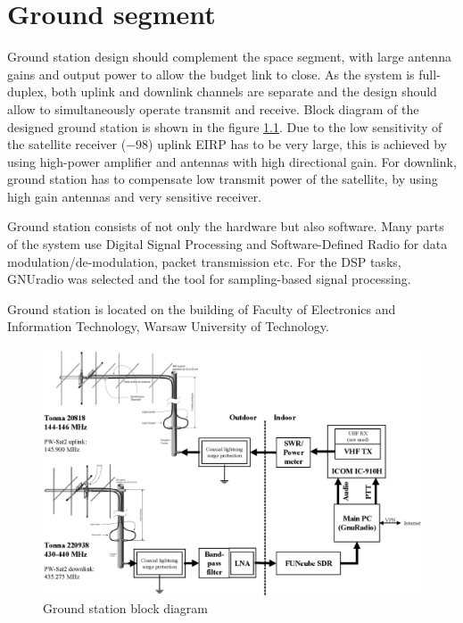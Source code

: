 \chapter{Ground segment}
Ground station design should complement the space segment, with large antenna gains and output power to allow the budget link to close. As the system is full-duplex, both uplink and downlink channels are separate and the design should allow to simultaneously operate transmit and receive. Block diagram of the designed ground station is shown in the figure \ref{gs_block_diagram}.
Due to the low sensitivity of the satellite receiver (\SI{-98}{\dBm}) uplink EIRP has to be very large, this is achieved by using high-power amplifier and antennas with high directional gain. For downlink, ground station has to compensate low transmit power of the satellite, by using high gain antennas and very sensitive receiver.

Ground station consists of not only the hardware but also software. Many parts of the system use Digital Signal Processing and Software-Defined Radio for data modulation/de-modulation, packet transmission etc. For the DSP tasks, GNUradio \cite{gnuradio} was selected and the tool for sampling-based signal processing.

Ground station is located on the building of Faculty of Electronics and Information Technology, Warsaw University of Technology.



\begin{figure}
    \centering
    \includegraphics[width=0.8\paperwidth]{img/7/gs_block_diagram.eps}
    \caption{Ground station block diagram}
    \label{gs_block_diagram}
\end{figure}

